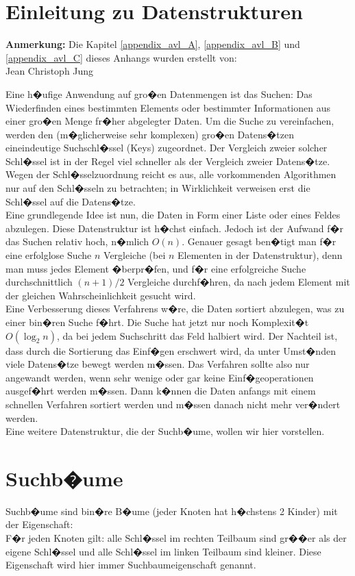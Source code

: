 \newtheorem{alg}{Algorithmus}

\chapter{\label{appendix_avl_A}Einleitung zu Datenstrukturen}
{\bfseries Anmerkung:} Die Kapitel \ref{appendix_avl_A}, \ref{appendix_avl_B} und \ref{appendix_avl_C} dieses Anhangs wurden erstellt von:\\
Jean Christoph Jung

Eine h�ufige Anwendung auf gro�en Datenmengen ist das Suchen: Das Wiederfinden eines bestimmten Elements oder bestimmter Informationen aus einer gro�en Menge fr�her abgelegter Daten. Um die Suche zu vereinfachen, werden den (m�glicherweise sehr komplexen) gro�en Datens�tzen eineindeutige Suchschl�ssel (Keys) zugeordnet. Der Vergleich zweier solcher Schl�ssel ist in der Regel viel schneller als der Vergleich zweier Datens�tze. Wegen der Schl�sselzuordnung reicht es aus, alle vorkommenden Algorithmen nur auf den Schl�sseln zu betrachten; in Wirklichkeit verweisen erst die Schl�ssel auf die Datens�tze.\\
Eine grundlegende Idee ist nun, die Daten in Form einer Liste oder eines Feldes abzulegen. Diese Datenstruktur ist h�chst einfach. Jedoch ist der Aufwand f�r das Suchen relativ hoch, n�mlich $O(n)$. Genauer gesagt ben�tigt man f�r eine erfolglose Suche $n$ Vergleiche (bei $n$ Elementen in der Datenstruktur), denn man muss jedes Element �berpr�fen, und f�r eine erfolgreiche Suche durchschnittlich $(n+1)/2$ Vergleiche durchf�hren, da nach jedem Element mit der gleichen Wahrscheinlichkeit gesucht wird.\\
Eine Verbesserung dieses Verfahrens w�re, die Daten sortiert abzulegen, was zu einer bin�ren Suche f�hrt. Die Suche hat jetzt nur noch Komplexit�t $O(\log_2{n})$, da bei jedem Suchschritt das Feld halbiert wird. Der Nachteil ist, dass durch die Sortierung das Einf�gen erschwert wird, da unter Umst�nden viele Datens�tze bewegt werden m�ssen. Das Verfahren sollte also nur angewandt werden, wenn sehr wenige oder gar keine Einf�geoperationen ausgef�hrt werden m�ssen. Dann k�nnen die Daten anfangs mit einem schnellen Verfahren sortiert werden und m�ssen danach nicht mehr ver�ndert werden.\\
Eine weitere Datenstruktur, die der Suchb�ume, wollen wir hier vorstellen.

\chapter{\label{appendix_avl_B}Suchb�ume}
Suchb�ume sind bin�re B�ume (jeder Knoten hat h�chstens 2 Kinder) mit der Eigenschaft:\\
F�r jeden Knoten gilt: alle Schl�ssel im rechten Teilbaum sind gr��er als der eigene Schl�ssel und alle Schl�ssel im linken Teilbaum sind kleiner. Diese Eigenschaft wird hier immer Suchbaumeigenschaft genannt.

